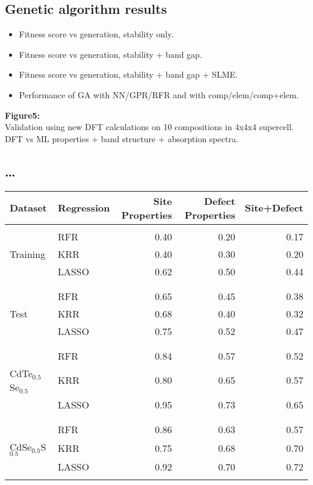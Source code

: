 \documentclass[aip, jmp, amsmath, amssymb, reprint]{revtex4-2}
\begin{document}
\subsection*{Genetic algorithm results}
\label{sec:orga5cf203}

\begin{itemize}
\item Fitness score vs generation, stability only.

\item Fitness score vs generation, stability + band gap.

\item Fitness score vs generation, stability + band gap + SLME.

\item Performance of GA with NN/GPR/RFR and with comp/elem/comp+elem.\\
\end{itemize}

\textbf{Figure5:}\\
Validation using new DFT calculations on 10 compositions in 4x4x4
supercell. DFT vs ML properties + band structure + absorption spectra.\\

\subsection*{\ldots{}}
\label{sec:org7f79f3e}
\begin{center}
\begin{tabular}{llrrr}
\textbf{Dataset} & \textbf{Regression} & \textbf{Site Properties} & \textbf{Defect Properties} & \textbf{Site+Defect}\\
\hline
 &  &  &  & \\
 & RFR & 0.40 & 0.20 & 0.17\\
Training & KRR & 0.40 & 0.30 & 0.20\\
 & LASSO & 0.62 & 0.50 & 0.44\\
 &  &  &  & \\
 &  &  &  & \\
 & RFR & 0.65 & 0.45 & 0.38\\
Test & KRR & 0.68 & 0.40 & 0.32\\
 & LASSO & 0.75 & 0.52 & 0.47\\
 &  &  &  & \\
 &  &  &  & \\
 & RFR & 0.84 & 0.57 & 0.52\\
CdTe\(_{0.5}\)Se\(_{0.5}\) & KRR & 0.80 & 0.65 & 0.57\\
 & LASSO & 0.95 & 0.73 & 0.65\\
 &  &  &  & \\
 &  &  &  & \\
 & RFR & 0.86 & 0.63 & 0.57\\
CdSe\(_{0.5}\)S\(_{0.5}\) & KRR & 0.75 & 0.68 & 0.70\\
 & LASSO & 0.92 & 0.70 & 0.72\\
 &  &  &  & \\
\end{tabular}
\end{center}
\end{document}
